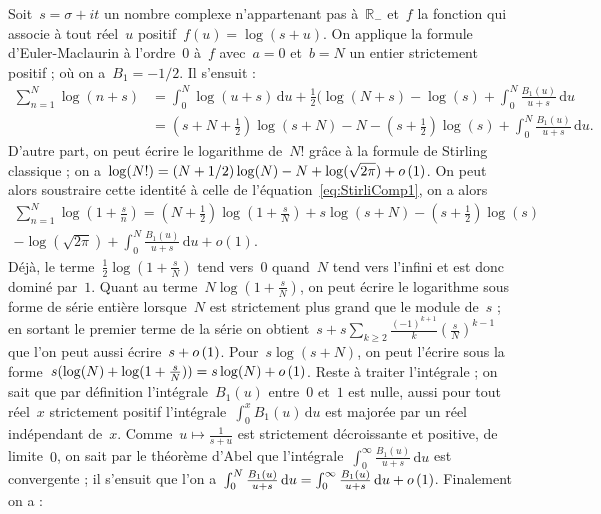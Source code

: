 		\begin{dem}
			Soit~$s=\sigma+it$ un nombre complexe n'appartenant pas à~$\mathbb{R}_-$ et~$f$ la fonction qui associe à tout réel~$u$ positif~$f(u)=\log(s+u)$. On applique la formule d'Euler-Maclaurin à l'ordre~$0$ à~$f$ avec~$a=0$ et~$b=N$ un entier strictement positif ; où on a~$B_1=-1/2$. Il s'ensuit :
			\begin{align}
				\sum_{n=1}^{N} \log(n+s) 
				&= \int_{0}^{N} \log(u+s)\,\mathrm{d}u + \frac{1}{2}(\log(N+s)-\log(s)
					+ \int_{0}^{N} \frac{B_1(u)}{u+s} \,\mathrm{d}u \nonumber\\
				&= \left(s+N+\frac{1}{2}\right)\log(s+N) - N - \left(s+\frac{1}{2}\right)\log(s) 
					+ \int_{0}^{N} \frac{B_1(u)}{u+s} \,\mathrm{d}u. \label{eq:StirliComp1}
			\end{align}
			D'autre part, on peut écrire le logarithme de~$N!$ grâce à la formule de Stirling classique ; on a~$\log(N!) = (N+1/2)\log(N) - N + \log(\sqrt{2\pi}) + o\left(1\right)$. On peut alors soustraire cette identité à celle de l'équation~\eqref{eq:StirliComp1}, on a alors
			\begin{multline*}
				\sum_{n=1}^{N} \log\left(1+\frac{s}{n}\right)
				= \left(N+\frac{1}{2}\right)\log\left(1+\frac{s}{N}\right) 
				+ s\log(s+N) 
				- \left(s+\frac{1}{2}\right)\log(s) \\
				- \log(\sqrt{2\pi})
				+ \int_0^N \frac{B_1(u)}{u+s}\,\mathrm{d}u + o(1).
			\end{multline*}
			Déjà, le terme~$\frac{1}{2}\log(1+\frac{s}{N})$ tend vers~$0$ quand~$N$ tend vers l'infini et est donc dominé par~$1$. Quant au terme~$N\log(1+\frac{s}{N})$, on peut écrire le logarithme sous forme de série entière lorsque~$N$ est strictement plus grand que le module de~$s$ ; en sortant le premier terme de la série on obtient~$s+s\sum_{k\geq 2} \frac{(-1)^{k+1}}{k} (\frac{s}{N})^{k-1}$ que l'on peut aussi écrire~$s+o\left(1\right)$. Pour~$s\log(s+N)$, on peut l'écrire sous la forme~$s(\log(N)+\log(1+\frac{s}{N})) = s\log(N)+o\left(1\right)$. Reste à traiter l'intégrale ; on sait que par définition l'intégrale~$B_1(u)$ entre~$0$ et~$1$ est nulle, aussi pour tout réel~$x$ strictement positif l'intégrale~$\int_{0}^{x} B_1(u)\,\mathrm{d}u$ est majorée par un réel indépendant de~$x$. Comme~$u\mapsto \frac{1}{s+u}$ est strictement décroissante et positive, de limite~$0$, on sait par le théorème d'Abel que l'intégrale~$\int_{0}^{\infty} \frac{B_1(u)}{u+s}\,\mathrm{d}u$ est convergente ; il s'ensuit que l'on a~$\int_{0}^N \frac{B_1(u)}{u+s}\,\mathrm{d}u = \int_{0}^{\infty} \frac{B_1(u)}{u+s}\,\mathrm{d}u + o\left(1\right)$. Finalement on a :

\end{dem}
